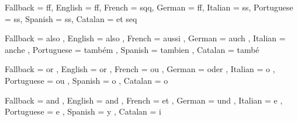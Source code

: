   {
    Fallback   = ff\abbrdot ,
    English    = ff\abbrdot ,
    French     = sqq\abbrdot ,
    German     = ff\abbrdot ,
    Italian    = ss\abbrdot ,
    Portuguese = ss\abbrdot ,
    Spanish    = ss\abbrdot ,
    Catalan    = et seq\abbrdot
  }

  {
    Fallback   = also ,
    English    = also ,
    French     = aussi ,
    German     = auch ,
    Italian    = anche ,
    Portuguese = tamb\'{e}m ,
    Spanish    = tambien ,
    Catalan    = tamb\'{e}
  }

  {
    Fallback   = or ,
    English    = or ,
    French     = ou ,
    German     = oder ,
    Italian    = o ,
    Portuguese = ou ,
    Spanish    = o ,
    Catalan    = o
  }

  {
    Fallback   = and ,
    English    = and ,
    French     = et ,
    German     = und ,
    Italian    = e ,
    Portuguese = e ,
    Spanish    = y ,
    Catalan    = i
  }

\AcroModuleEnd
